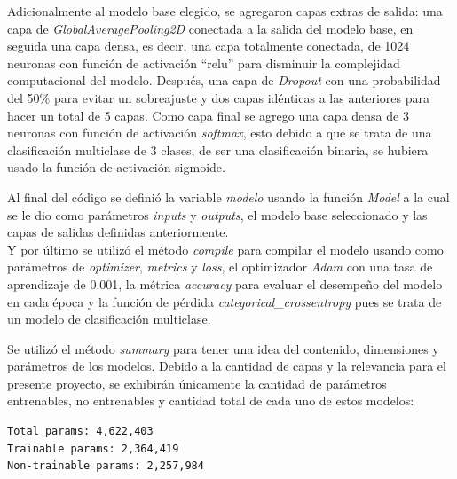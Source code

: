 Adicionalmente al modelo base elegido, se agregaron capas extras de salida: una capa de \textit{GlobalAveragePooling2D} conectada a la salida del modelo base, en seguida una capa densa, es decir, una capa totalmente conectada, de 1024 neuronas con función de activación ``relu'' para disminuir la complejidad computacional del modelo. Después, una capa de \textit{Dropout} con una probabilidad del 50\% para evitar un sobreajuste y dos capas idénticas a las anteriores para hacer un total de 5 capas. Como capa final se agrego una capa densa de 3 neuronas con función de activación \textit{softmax}, esto debido a que se trata de una clasificación multiclase de 3 clases, de ser una clasificación binaria, se hubiera usado la función de activación sigmoide.

\newpage

Al final del código se definió la variable \textit{modelo} usando la función \textit{Model} a la cual se le dio como parámetros \textit{inputs} y \textit{outputs}, el modelo base seleccionado y las capas de salidas definidas anteriormente. \\
Y por último se utilizó el método \textit{compile} para compilar el modelo usando como parámetros de \textit{optimizer}, \textit{metrics} y \textit{loss}, el optimizador \textit{Adam} con una tasa de aprendizaje de 0.001, la métrica \textit{accuracy} para evaluar el desempeño del modelo en cada época y la función de pérdida \textit{categorical\_crossentropy} pues se trata de un modelo de clasificación multiclase.

Se utilizó el método \textit{summary} para tener una idea del contenido, dimensiones y parámetros de los modelos. Debido a la cantidad de capas y la relevancia para el presente proyecto, se exhibirán únicamente la cantidad de parámetros entrenables, no entrenables y cantidad total de cada uno de estos modelos: \\


\begin{lstlisting}[caption={Salida del método summary aplicado a la red de \textit{Transfer Learning} con \textit{MobileNetV2}}]
Total params: 4,622,403
Trainable params: 2,364,419
Non-trainable params: 2,257,984
\end{lstlisting}

